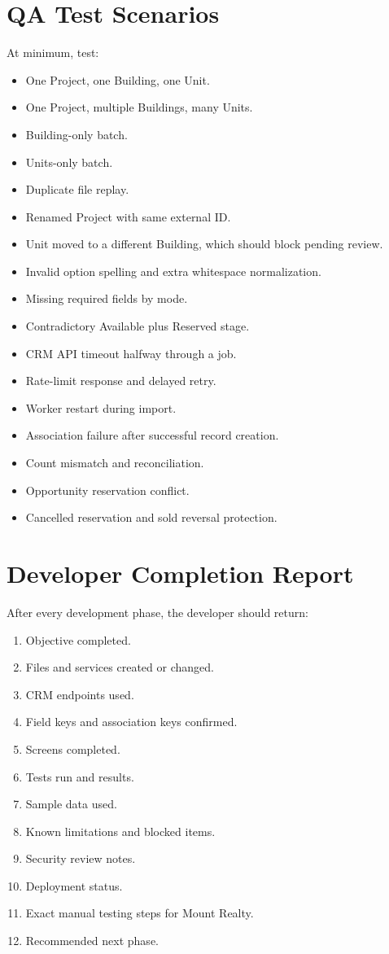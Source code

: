 \documentclass[10pt]{article}
\begin{document}
\section{QA Test Scenarios}
At minimum, test:
\begin{itemize}
\item One Project, one Building, one Unit.
\item One Project, multiple Buildings, many Units.
\item Building-only batch.
\item Units-only batch.
\item Duplicate file replay.
\item Renamed Project with same external ID.
\item Unit moved to a different Building, which should block pending review.
\item Invalid option spelling and extra whitespace normalization.
\item Missing required fields by mode.
\item Contradictory Available plus Reserved stage.
\item CRM API timeout halfway through a job.
\item Rate-limit response and delayed retry.
\item Worker restart during import.
\item Association failure after successful record creation.
\item Count mismatch and reconciliation.
\item Opportunity reservation conflict.
\item Cancelled reservation and sold reversal protection.
\end{itemize}

\section{Developer Completion Report}
After every development phase, the developer should return:
\begin{enumerate}
\item Objective completed.
\item Files and services created or changed.
\item CRM endpoints used.
\item Field keys and association keys confirmed.
\item Screens completed.
\item Tests run and results.
\item Sample data used.
\item Known limitations and blocked items.
\item Security review notes.
\item Deployment status.
\item Exact manual testing steps for Mount Realty.
\item Recommended next phase.
\end{enumerate}
\end{document}
